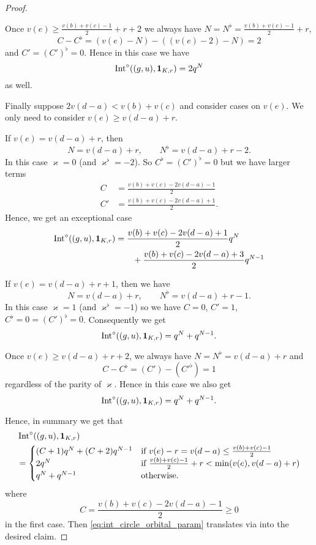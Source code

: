 \begin{proof}
\begin{itemize}
\begin{itemize}
      \ii Once $v(e) \ge \frac{v(b)+v(c)-1}{2} + r + 2$
      we always have $N = N^\flat = \frac{v(b)+v(c)-1}{2} + r$,
      \[ C - C^\flat = (v(e)-N)-((v(e)-2)-N) = 2 \]
      and $C' = (C')^\flat = 0$.
      Hence in this case we have
      \[ \operatorname{Int}^\circ((g,u), \mathbf{1}_{K, r}) = 2 q^N \]
      as well.
    \end{itemize}

    \ii Finally suppose $2v(d-a) < v(b) + v(c)$ and consider cases on $v(e)$.
    We only need to consider $v(e) \ge v(d-a) + r$.
    \begin{itemize}
      \ii If $v(e) = v(d-a) + r$,
      then \[ N = v(d-a) + r, \qquad N^\flat = v(d-a) + r - 2. \]
      In this case $\varkappa = 0$ (and $\varkappa^\flat=-2$).
      So $C^\flat = (C')^\flat = 0$ but we have larger terms
      \begin{align*}
        C &= \frac{v(b) + v(c)- 2v(d-a) - 1}{2} \\
        C' &= \frac{v(b) + v(c)- 2v(d-a) + 1}{2}.
      \end{align*}
      Hence, we get an exceptional case
      \begin{align*}
        \operatorname{Int}^\circ((g,u), \mathbf{1}_{K, r})
        &= \frac{v(b) + v(c) - 2v(d-a) + 1}{2} q^{N} \\
        &\qquad+ \frac{v(b) + v(c) - 2v(d-a) + 3}{2} q^{N-1}
      \end{align*}

      \ii If $v(e) = v(d-a) + r + 1$,
      then we have
      \[ N = v(d-a) + r, \qquad N^\flat = v(d-a) + r - 1. \]
      In this case $\varkappa = 1$ (and $\varkappa^\flat=-1$) so we have
      $C = 0$, $C' = 1$, $C^\flat = 0 = (C')^\flat = 0$.
      Consequently we get
      \[ \operatorname{Int}^\circ((g,u), \mathbf{1}_{K, r}) = q^{N} + q^{N-1}. \]

      \ii Once $v(e) \ge v(d-a) + r + 2$,
      we always have $N = N^\flat = v(d-a) + r$ and
      \[ C - C^\flat = (C') - (C'^\flat) = 1 \]
      regardless of the parity of $\varkappa$.
      Hence in this case we also get
      \[ \operatorname{Int}^\circ((g,u), \mathbf{1}_{K, r}) = q^{N} + q^{N-1}. \]
    \end{itemize}
  \end{itemize}
  Hence, in summary we get that
  \begin{equation}
  \begin{aligned}
    &\operatorname{Int}^\circ((g,u), \mathbf{1}_{K, r}) \\
    &= \begin{cases}
      (C+1) q^{N} + (C+2) q^{N-1}
        & \text{if } v(e)-r = v(d-a) \le \frac{v(b)+v(c)-1}{2} \\
      2q^N & \text{if } \frac{v(b)+v(c)-1}{2} + r < \min(v(e), v(d-a)+r) \\
      q^N + q^{N-1} & \text{otherwise}.
    \end{cases}
  \end{aligned}
  \label{eq:int_circle_orbital_param}
  \end{equation}
  where
  \[ C = \frac{v(b) + v(c)- 2v(d-a) - 1}{2} \ge 0 \]
  in the first case.
  Then \eqref{eq:int_circle_orbital_param} translates via
   into the desired claim.
\end{proof}
